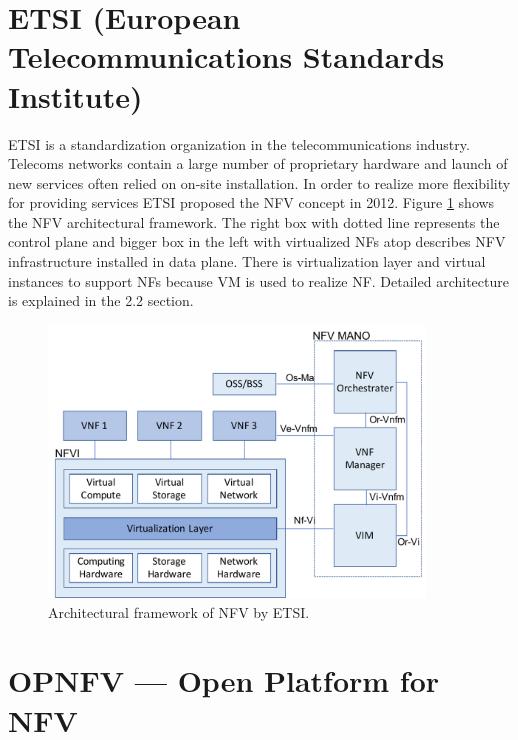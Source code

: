 \section{ETSI (European Telecommunications Standards Institute)}
ETSI\cite{ETSI} is a standardization organization in the telecommunications industry. Telecoms networks contain a large number of proprietary hardware and launch of new services often relied on on-site installation. In order to realize more flexibility for providing services ETSI proposed the NFV concept in 2012. Figure \ref{fig: ETSI_arc} shows the NFV architectural framework. The right box with dotted line represents the control plane and bigger box in the left with virtualized NFs atop describes NFV infrastructure installed in data plane. There is virtualization layer and virtual instances to support NFs because VM is used to realize NF. Detailed architecture is explained in the 2.2 section. 

\begin{figure}
	\centering
	\includegraphics[width=100mm]{pics/ETSI_architecture.pdf}
	\caption{Architectural framework of NFV by ETSI.}
	\label{fig: ETSI_arc}
\end{figure}

\section{OPNFV --- Open Platform for NFV}
